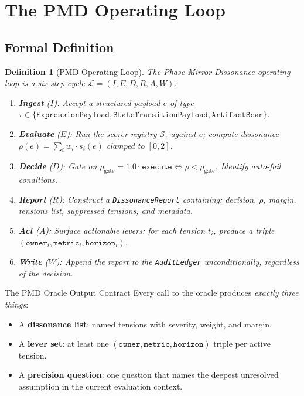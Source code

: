 \documentclass[11pt,letterpaper]{article}
\newtheorem{definition}[theorem]{Definition}
\theoremstyle{remark}
\newcommand{\rhogate}{\rho_{\mathrm{gate}}}
\newcommand{\rhosys}{\rho}
\begin{document}
\section{The PMD Operating Loop}
\label{sec:loop}

\subsection{Formal Definition}

\begin{definition}[PMD Operating Loop]
\label{def:pmd-loop}
The \emph{Phase Mirror Dissonance operating loop} is a six-step cycle
$\mathcal{L} = (I, E, D, R, A, W)$:

\begin{enumerate}[leftmargin=1.5em, label=\textbf{Step \arabic*.}]
  \item \textbf{Ingest} ($I$): Accept a structured payload $e$ of type
        $\tau \in \{\texttt{ExpressionPayload}, \texttt{StateTransitionPayload},
        \texttt{ArtifactScan}\}$.
  \item \textbf{Evaluate} ($E$): Run the scorer registry $\mathcal{S}_\tau$
        against $e$; compute dissonance $\rhosys(e) = \sum_i w_i \cdot s_i(e)$
        clamped to $[0, 2]$.
  \item \textbf{Decide} ($D$): Gate on $\rhogate = 1.0$:
        $\texttt{execute} \Leftrightarrow \rhosys < \rhogate$.
        Identify auto-fail conditions.
  \item \textbf{Report} ($R$): Construct a \texttt{DissonanceReport}
        containing: decision, $\rhosys$, margin, tensions list,
        suppressed tensions, and metadata.
  \item \textbf{Act} ($A$): Surface actionable levers: for each tension
        $t_i$, produce a triple
        $(\texttt{owner}_i, \texttt{metric}_i, \texttt{horizon}_i)$.
  \item \textbf{Write} ($W$): Append the report to the \texttt{AuditLedger}
        \emph{unconditionally}, regardless of the decision.
\end{enumerate}
\end{definition}

\begin{oraclebox}{The PMD Oracle Output Contract}
Every call to the oracle produces \emph{exactly three things}:
\begin{itemize}[leftmargin=1em]
  \item A \textbf{dissonance list}: named tensions with severity, weight,
        and margin.
  \item A \textbf{lever set}: at least one
        $(\texttt{owner}, \texttt{metric}, \texttt{horizon})$ triple per
        active tension.
  \item A \textbf{precision question}: one question that names the deepest
        unresolved assumption in the current evaluation context.
\end{itemize}
\end{oraclebox}
\end{document}
